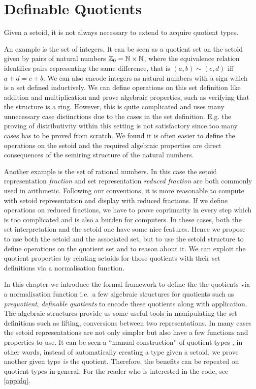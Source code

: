 \chapter{Definable Quotients}
\label{dq}



Given a setoid, it is not always necessary to extend \itt to acquire quotient types.

An example is the set of integers. It can be seen as a quotient set on
the setoid given by pairs of natural numbers
$\mathbb{Z}_0=\mathbb{N}\times\mathbb{N}$, where the equivalence relation identifies pairs
representing the same difference, that is  $(a,b)\sim(c,d)$ if{f}
$a+d=c+b$. 
We can also encode integers as natural 
numbers with a sign which is a set defined inductively.
We can define operations on this set definition like
addition and multiplication and prove algebraic properties,
such as verifying that the structure is a ring. 
However, this is quite complicated and uses many unnecessary case
distinctions due to the cases in the set definition. E.g. the proving of distributivity within this setting
is not satisfactory since too many cases has to be proved from
scratch. 
We found it is often easier to define the operations on the
setoid and the required algebraic properties are direct consequences
of the semiring structure of the natural numbers.

Another example is the set of rational numbers. In this case the setoid representation \emph{fraction} and set representation \emph{reduced fraction} are both commonly used in arithmetic. Following our conventions, it is more reasonable to compute with setoid representation and display with reduced fractions. If we define operations on reduced fractions, we have to prove coprimarity in every step which is too complicated and is also a burden for computers.
In these cases, both the set interpretation and the setoid one
have some nice features.
Hence we propose to use both the setoid
and the associated set, but to use the setoid structure to define
operations on the quotient set and to reason about it. We can exploit the quotient properties by relating setoids for those quotients with their set definitions via a normalisation function.


In this chapter we introduce the formal framework to define the
the quotients via a normalisation function i.e.\ a few algebraic structures for quotients such as \emph{prequotient}, \emph{definable quotients} to encode these quotients along with application.
The algebraic structures provide us some useful tools in manipulating the set definitions such as lifting, 
 conversions between two representations. In many cases the setoid representations are not only simpler but also have a few functions and properties to use. 
It can be seen a ``manual construction'' of quotient types
, in other words,
instead of automatically creating a type given a setoid, we
prove another given type \emph{is} the quotient. Therefore, the benefits can be repeated on quotient types in general.
For the reader who is interested in the code, see \autoref{app:dq}.

